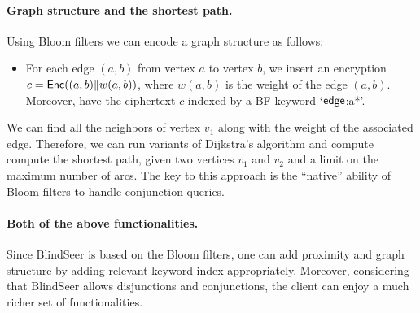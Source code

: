 \paragraph{Graph structure and the shortest path.}
Using Bloom filters we can encode a graph structure as follows:
\begin{itemize}
\item For each edge $(a, b)$ from vertex $a$ to vertex $b$, we insert an
  encryption $c = \mathsf{Enc}((a,b) \| w(a,b) )$, where $w(a,b)$ is the weight of the edge
    $(a,b)$. Moreover, have the ciphertext $c$ indexed by a BF keyword `$\sf edge$:a*'. 
\end{itemize}

\noindent
We can find all the neighbors of vertex $v_1$
along with the weight of the associated edge. Therefore, we can run variants of
Dijkstra's algorithm and compute compute the shortest path, given two vertices
$v_1$ and $v_2$ and a limit on the maximum number of arcs. The key to this approach is the ``native'' ability of Bloom filters to handle conjunction queries.

\paragraph{Both of the above functionalities.}
Since BlindSeer is based on the Bloom filters, one can add proximity and graph structure by adding
relevant keyword index appropriately.
%
Moreover, considering that BlindSeer allows disjunctions and conjunctions, the
client can enjoy a much richer set of functionalities.  
